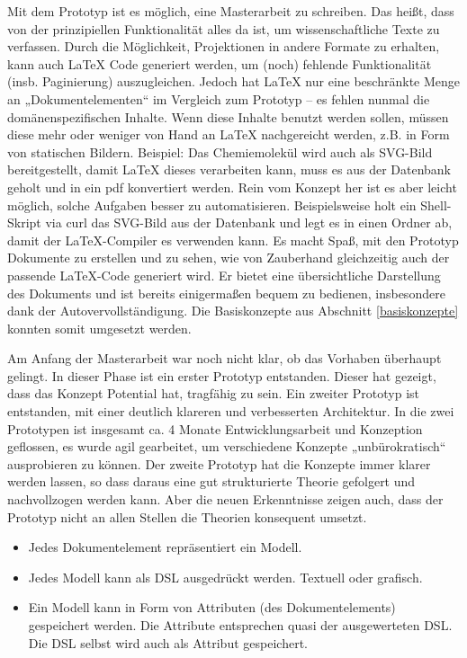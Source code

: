 Mit dem Prototyp ist es möglich, eine Masterarbeit zu schreiben. Das heißt, dass von der prinzipiellen Funktionalität alles da ist, um wissenschaftliche Texte zu verfassen. Durch die Möglichkeit, Projektionen in andere Formate zu erhalten, kann auch LaTeX Code generiert werden, um (noch) fehlende Funktionalität (insb. Paginierung) auszugleichen. Jedoch hat LaTeX nur eine beschränkte Menge an „Dokumentelementen“ im Vergleich zum Prototyp -- es fehlen nunmal die domänenspezifischen Inhalte. Wenn diese Inhalte benutzt werden sollen, müssen diese mehr oder weniger von Hand an LaTeX nachgereicht werden, z.B. in Form von statischen Bildern. Beispiel: Das Chemiemolekül wird auch als SVG-Bild bereitgestellt, damit LaTeX dieses verarbeiten kann, muss es aus der Datenbank geholt und in ein pdf konvertiert werden. Rein vom Konzept her ist es aber leicht möglich, solche Aufgaben besser zu automatisieren. Beispielsweise holt ein Shell-Skript via curl das SVG-Bild aus der Datenbank und legt es in einen Ordner ab, damit der LaTeX-Compiler es verwenden kann. Es macht Spaß, mit den Prototyp Dokumente zu erstellen und zu sehen, wie von Zauberhand gleichzeitig auch der passende LaTeX-Code generiert wird. Er bietet eine übersichtliche Darstellung des Dokuments und ist bereits einigermaßen bequem zu bedienen, insbesondere dank der Autovervollständigung. Die Basiskonzepte aus Abschnitt \ref{basiskonzepte} konnten somit umgesetzt werden.

 
Am Anfang der Masterarbeit war noch nicht klar, ob das Vorhaben überhaupt gelingt. In dieser Phase ist ein erster Prototyp entstanden. Dieser hat gezeigt, dass das Konzept Potential hat, tragfähig zu sein. Ein zweiter Prototyp ist entstanden, mit einer deutlich klareren und verbesserten Architektur. In die zwei Prototypen ist insgesamt ca. 4 Monate Entwicklungsarbeit und Konzeption geflossen, es wurde agil gearbeitet, um verschiedene Konzepte „unbürokratisch“ ausprobieren zu können. Der zweite Prototyp hat die Konzepte immer klarer werden lassen, so dass daraus eine gut strukturierte Theorie gefolgert und nachvollzogen werden kann. Aber die neuen Erkenntnisse zeigen auch, dass der Prototyp nicht an allen Stellen die Theorien konsequent umsetzt.

 
\begin{itemize}

\item Jedes Dokumentelement repräsentiert ein Modell.
\item Jedes Modell kann als DSL ausgedrückt werden. Textuell oder grafisch.
\item Ein Modell kann in Form von Attributen (des Dokumentelements) gespeichert werden. Die Attribute entsprechen quasi der ausgewerteten DSL. Die DSL selbst wird auch als Attribut gespeichert.
\end{itemize}
 
